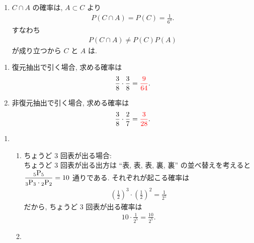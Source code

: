 \begin{qenumerate}
{\begin{enumerate}
{				$B\cap C$ の確率は, $B\subset C$ より
				\begin{align}
					P(B\cap C) = P(C) = \frac{1}{6^{3}}.
				\end{align}
				すなわち
				\begin{align}
					P(B\cap C)\neq P(B)P(C)
				\end{align}
				が成り立つから $B$ と $C$ は.
			}
			\item{
				$C\cap A$ の確率は, $A\subset C$ より
				\begin{align}
					P(C\cap A) = P(C) = \frac{1}{6^{3}}.
				\end{align}
				すなわち
				\begin{align}
					P(C\cap A)\neq P(C)P(A)
				\end{align}
				が成り立つから $C$ と $A$ は.
			}
		\end{enumerate}
	}
	\item{
		\begin{enumerate}
			\item{
				復元抽出で引く場合, 求める確率は
				\begin{align}
					\frac{3}{8}\cdot\frac{3}{8} = \textcolor{red}{\frac{9}{64}}.
				\end{align}
			}
			\item{
				非復元抽出で引く場合, 求める確率は
				\begin{align}
					\frac{3}{8}\cdot\frac{2}{7} = \textcolor{red}{\frac{3}{28}}.
				\end{align}
			}
		\end{enumerate}
	}
	\item{
		\begin{enumerate}
			\item{
				\begin{enumerate}
					\item{
						ちょうど 3 回表が出る場合: \\
						ちょうど 3 回表が出る出方は ``表, 表, 表, 裏, 裏'' の並べ替えを考えると $\dfrac{{{}_{5}\mathrm{P}_{5}}}{{{}_{3}\mathrm{P}_{3}}\cdot{{}_{2}\mathrm{P}_{2}}} = 10$ 通りである.
						それぞれが起こる確率は
						\begin{align}
							\left(\frac{1}{2}\right)^{3}\cdot\left(\frac{1}{2}\right)^{2} = \frac{1}{2^{5}}
						\end{align}
						だから, ちょうど 3 回表が出る確率は
						\begin{align}
							10\cdot\frac{1}{2^{5}} = \frac{10}{2^{5}}.
						\end{align}
					}
					\item{
}
\end{enumerate}}
\end{enumerate}}
\end{qenumerate}
